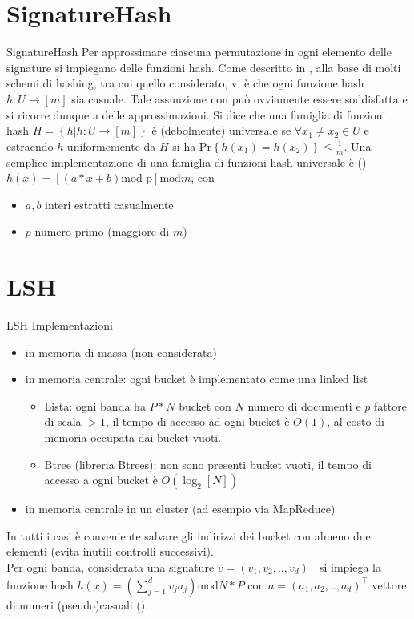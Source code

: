 \documentclass[10pt]{beamer}
\begin{document}
\section{SignatureHash}
\begin{frame}{SignatureHash}
Per approssimare ciascuna permutazione in ogni elemento delle signature si impiegano delle funzioni hash.
Come descritto in \cite{BroderMin-wise}, alla base di molti schemi di hashing, tra cui quello considerato, vi è che ogni funzione hash $h:U \rightarrow [m]$ sia casuale. Tale assunzione non può ovviamente essere soddisfatta e si ricorre dunque a delle approssimazioni. Si dice che una famiglia di funzioni hash $H = \left\{h | h:U \rightarrow [m] \right\}$ è (debolmente) universale se $\forall x_1 \neq x_2 \in U$ e estraendo $h$ 
uniformemente da $H$ si ha $\text{Pr}\left\{h(x_1) = h(x_2)\right\} \leq \frac{1}{m}$. Una semplice implementazione di una famiglia di funzioni hash universale è (\cite{IndykApproximate})
$h(x) = [(a * x + b) \text{mod p}] \text{mod} m$,
con
\begin{itemize}
	\item $a,b$ interi estratti casualmente
	\item $p$ numero primo (maggiore di $m$)
\end{itemize}
\end{frame}

\section{LSH}
\begin{frame}{LSH}
Implementazioni
\begin{itemize}
	\item in memoria di massa (non considerata)
	\item in memoria centrale: ogni bucket è implementato come una linked list
	\begin{itemize}
		\item Lista: ogni banda ha $P * N$ bucket con $N$ numero di documenti e $p$ fattore di scala $>1$, il tempo di accesso ad ogni bucket è $O(1)$, al costo di memoria occupata dai bucket vuoti.
		\item Btree (libreria Btrees): non sono presenti bucket vuoti, il tempo di accesso a ogni bucket è $O(\log_2[N])$
	\end{itemize}
	\item in memoria centrale in un cluster (ad esempio via MapReduce)
\end{itemize}
In tutti i casi è conveniente salvare gli indirizzi dei bucket con almeno due elementi (evita inutili controlli successivi).\\
Per ogni banda, considerata una signature $v = (v_1,v_2,..,v_d)^\top$ si impiega la funzione hash $h(x) = \left( \sum^d_{j = 1}v_j a_j \right) \text{mod} N*P$  con $a = (a_1,a_2,..,a_d)^\top$ vettore di numeri (pseudo)casuali (\cite{IndykApproximate}).
\end{frame}
\end{document}
